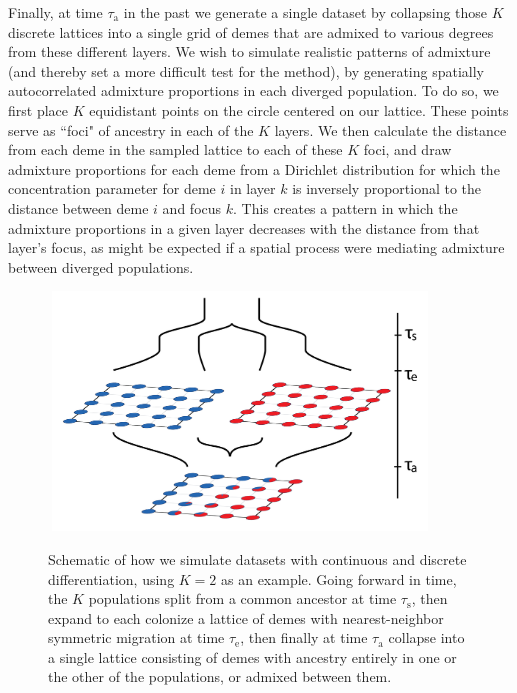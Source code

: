 \documentclass[12pt]{article}
\begin{document}
Finally, at time $\tau_{\text{a}}$ in the past 
we generate a single dataset 
by collapsing those $K$ discrete lattices into a single grid of demes 
that are admixed to various degrees from these different layers. 
We wish to simulate realistic patterns of admixture 
(and thereby set a more difficult test for the method), 
by generating spatially autocorrelated admixture proportions 
in each diverged population.
To do so, we first place $K$ equidistant points on the circle centered on our lattice.  
These points serve as ``foci" of ancestry in each of the $K$ layers.  
We then calculate the distance from each deme in the sampled lattice to each of these $K$ foci, 
and draw admixture proportions for each deme 
from a Dirichlet distribution for which the concentration parameter 
for deme $i$ in layer $k$ is inversely proportional to the distance between deme $i$ and focus $k$. 
This creates a pattern in which the admixture proportions in a given layer decreases 
with the distance from that layer's focus, 
as might be expected if a spatial process were mediating admixture between diverged populations.

\begin{figure}
	\centering
		{\includegraphics[width=4in,height=2.5in]{figs/sims/sim_setup.png}}
		\caption{Schematic of how we simulate datasets with continuous and discrete differentiation, using $K=2$ as an example.  
			    Going forward in time, the $K$ populations split from a common ancestor at time $\tau_{\text{s}}$,
			    then expand to each  colonize a lattice of demes with nearest-neighbor symmetric migration at time $\tau_{\text{e}}$,
			    then finally at time $\tau_{\text{a}}$ collapse into a single lattice consisting of demes 
			    with ancestry entirely in one or the other of the populations,
			    or admixed between them.
			    }\label{sim_setup}
\end{figure}

\clearpage
\newpage
\end{document}

